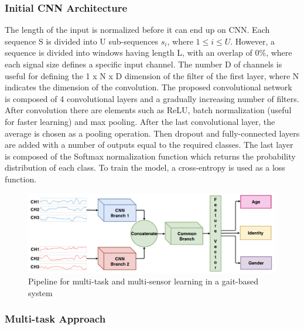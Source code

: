 \subsubsection{Initial CNN Architecture}
The length of the input is normalized before it can end up on CNN. Each 
sequence S is divided into U sub-sequences $ s_i $, where $ 1 \leq i \leq U $. However, 
a sequence is divided into windows having length L, with an overlap of 0\%, 
where each signal size defines a specific input channel. The number D of 
channels is useful for defining the 1 x N x D dimension of the filter of the 
first layer, where N indicates the dimension of the convolution. The proposed 
convolutional network is composed of 4 convolutional layers and a gradually 
increasing number of filters. After convolution there are elements such as 
ReLU, batch normalization (useful for faster learning) and max pooling. After 
the last convolutional layer, the average is chosen as a pooling operation. 
Then dropout and fully-connected layers are added with a number of outputs 
equal to the required classes. The last layer is composed of the Softmax 
normalization function which returns the probability distribution of each class. 
To train the model, a cross-entropy is used as a loss function.
\begin{figure}[htbp]
    \centering
    \includegraphics[width = 1 \linewidth]{images/paper5/architecture.png}
    \centering
    \caption{Pipeline for multi-task and multi-sensor learning in a gait-based system}
    \label{fig:pipeline}
\end{figure}

\subsubsection{Multi-task Approach}